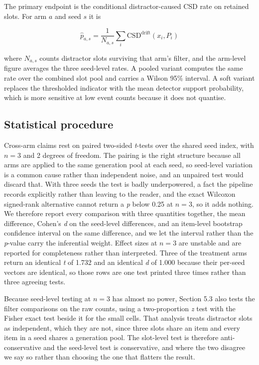 \documentclass[11pt]{article}
\begin{document}
The primary endpoint is the conditional distractor-caused CSD rate on retained slots. For arm $a$ and seed $s$ it is

\begin{equation}
\hat{p}_{a,s} = \frac{1}{N_{a,s}} \sum_{i} \mathrm{CSD}^{\text{drift}}(x_i, P_i)
\end{equation}

where $N_{a,s}$ counts distractor slots surviving that arm's filter, and the arm-level figure averages the three seed-level rates. A pooled variant computes the same rate over the combined slot pool and carries a Wilson 95\% interval. A soft variant replaces the thresholded indicator with the mean detector support probability, which is more sensitive at low event counts because it does not quantise.

\subsection{Statistical procedure}

Cross-arm claims rest on paired two-sided \emph{t}-tests over the shared seed index, with $n = 3$ and 2 degrees of freedom. The pairing is the right structure because all arms are applied to the same generation pool at each seed, so seed-level variation is a common cause rather than independent noise, and an unpaired test would discard that. With three seeds the test is badly underpowered, a fact the pipeline records explicitly rather than leaving to the reader, and the exact Wilcoxon signed-rank alternative cannot return a \emph{p} below 0.25 at $n = 3$, so it adds nothing. We therefore report every comparison with three quantities together, the mean difference, Cohen's \emph{d} on the seed-level differences, and an item-level bootstrap confidence interval on the same difference, and we let the interval rather than the \emph{p}-value carry the inferential weight. Effect sizes at $n = 3$ are unstable and are reported for completeness rather than interpreted. Three of the treatment arms return an identical \emph{t} of 1.732 and an identical \emph{d} of 1.000 because their per-seed vectors are identical, so those rows are one test printed three times rather than three agreeing tests.

Because seed-level testing at $n = 3$ has almost no power, Section 5.3 also tests the filter comparisons on the raw counts, using a two-proportion \emph{z} test with the Fisher exact test beside it for the small cells. That analysis treats distractor slots as independent, which they are not, since three slots share an item and every item in a seed shares a generation pool. The slot-level test is therefore anti-conservative and the seed-level test is conservative, and where the two disagree we say so rather than choosing the one that flatters the result.
\end{document}
